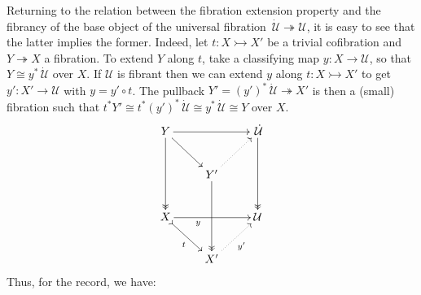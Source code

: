 \documentclass[11pt]{amsart}
\newcommand{\ra}{\ensuremath{\rightarrow}}
\newcommand{\cof}{\ensuremath{\rightarrowtail}}
\newcommand{\fib}{\ensuremath{\twoheadrightarrow}}
\newcommand{\I}{\ensuremath{\mathrm{I}}}
\newcommand{\U}{\ensuremath{\mathcal{U}}}
\newcommand{\UU}{\ensuremath{\,\dot{\mathcal{U}}}}
\newtheorem{proposition}[theorem]{Proposition}
\newtheorem{lemma}[theorem]{Lemma}
\theoremstyle{remark}
\theoremstyle{definition}
\begin{document}
%
%
%
%
%

Returning to the relation between the fibration extension property and the fibrancy of the base object of the universal fibration $\UU\fib\U$, it is easy to see that the latter implies the former.  Indeed, let $t : X\cof X'$ be a trivial cofibration and $Y \fib X$ a fibration.  To extend $Y$ along $t$, take a classifying map $y : X \ra \U$, so that $Y \cong y^*\UU$ over $X$. If $\U$ is fibrant then we can extend $y$ along $t : X\cof X'$ to get $y' : X' \ra \U$ with $y = y'\circ t$.  The pullback $Y' = (y')^*\UU \fib X'$ is then a (small) fibration such that $t^*Y' \cong t^*(y')^*\UU\cong y^*\UU \cong Y$ over $X$.  
\[
\xymatrix{
Y \ar@{->>}[dd] \ar[rd] \ar[rr] && \UU \ar@{->>}[dd] \\
& Y' \ar@{->>}[dd] \ar@{..>}[ru] & \\
X  \ar@{>->}[rd]_t \ar[rr]_<<<<<<<<{y}  && \U  \\
& X' \ar@{..>}[ru]_{y'} &
}
\]
Thus, for the record, we have:
\end{document}

